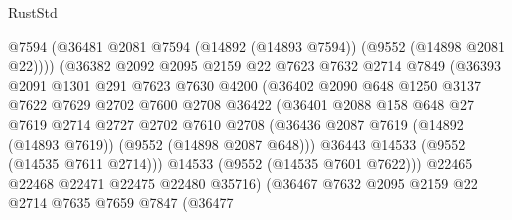 \begin{lexlean}{RustStd}
\begin{coremodule}
                            @7594
                            (@36481 @2081 @7594 (@14892 (@14893 @7594)) (@9552 (@14898 @2081 @22))))
                          (@36382
                            @2092
                            @2095
                            @2159
                            @22
                            @7623
                            @7632
                            @2714
                            @7849
                            (@36393
                              @2091
                              @1301
                              @291
                              @7623
                              @7630
                              @4200
                              (@36402
                                @2090
                                @648
                                @1250
                                @3137
                                @7622
                                @7629
                                @2702
                                @7600
                                @2708
                                @36422
                                (@36401
                                  @2088
                                  @158
                                  @648
                                  @27
                                  @7619
                                  @2714
                                  @2727
                                  @2702
                                  @7610
                                  @2708
                                  (@36436
                                    @2087
                                    @7619
                                    (@14892 (@14893 @7619))
                                    (@9552 (@14898 @2087 @648)))
                                  @36443
                                  @14533
                                  (@9552 (@14535 @7611 @2714)))
                                @14533
                                (@9552 (@14535 @7601 @7622)))
                              @22465
                              @22468
                              @22471
                              @22475
                              @22480
                              @35716)
                            (@36467
                              @7632
                              @2095
                              @2159
                              @22
                              @2714
                              @7635
                              @7659
                              @7847
                              (@36477

\end{coremodule}
\end{lexlean}
